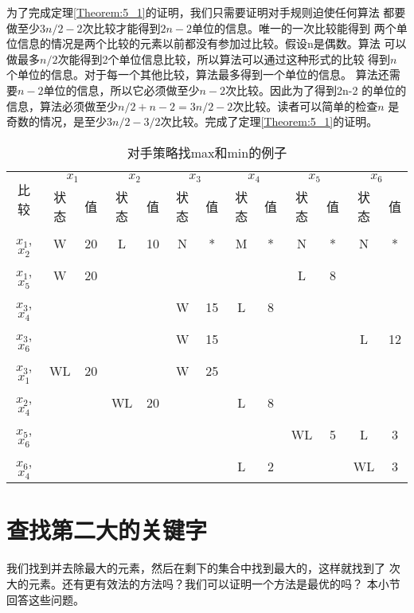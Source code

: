 为了完成定理\ref{Theorem:5_1}的证明，我们只需要证明对手规则迫使任何算法
都要做至少$3n/2-2$次比较才能得到$2n-2$单位的信息。唯一的一次比较能得到
两个单位信息的情况是两个比较的元素以前都没有参加过比较。假设n是偶数。算法
可以做最多$n/2$次能得到2个单位信息比较，所以算法可以通过这种形式的比较
得到$n$个单位的信息。对于每一个其他比较，算法最多得到一个单位的信息。
算法还需要$n-2$单位的信息，所以它必须做至少$n-2$次比较。因此为了得到2n-2
的单位的信息，算法必须做至少$n/2+n-2=3n/2-2$次比较。读者可以简单的检查$n$
是奇数的情况，是至少$3n/2-3/2$次比较。完成了定理\ref{Theorem:5_1}的证明。


\begin{table}
\centering
\begin{tabular}{c |cc|cc|cc|cc|cc|cc}
\hline
\multirow{2}{*}{比较} &\multicolumn{2}{c}{$x_1$} &\multicolumn{2}{c}{$x_2$} &\multicolumn{2}{c}{$x_3$}
&\multicolumn{2}{c}{$x_4$} &\multicolumn{2}{c}{$x_5$} &\multicolumn{2}{c}{$x_6$} \\

\cline{2-13}&状态 &值 &状态 &值 &状态 &值 &状态 &值 &状态 &值 &状态 &值 \\

\hline
$x_1$,$x_2$ &W&20 &L&10 &N&* &M&* &N&* &N&* \\
\hline
$x_1$,$x_5$ &W&20 & &   & &  & &  &L&8 & &  \\
\hline
$x_3$,$x_4$ & &   & &   &W&15 &L&8 & &  & &  \\
\hline
$x_3$,$x_6$ & &   & &   &W&15 & &  & &  &L &12  \\
\hline
$x_3$,$x_1$ &WL&20 & &   &W &25  & &  & &  & &  \\
\hline
$x_2$,$x_4$ & & &WL&20    & & &L &8   & &  & &  \\
\hline
$x_5$,$x_6$ & & & &     & & &  &    &WL &5  &L &3  \\
\hline
$x_6$,$x_4$ & & & &     & & &L &2   & &  &WL &3  \\
\hline

\end{tabular}
\caption{对手策略找max和min的例子}
\label{Table:AdversaryArgumentsExampleOfminAndmax} \centering
\end{table}

\section{查找第二大的关键字}
我们找到并去除最大的元素，然后在剩下的集合中找到最大的，这样就找到了
次大的元素。还有更有效法的方法吗？我们可以证明一个方法是最优的吗？
本小节回答这些问题。

